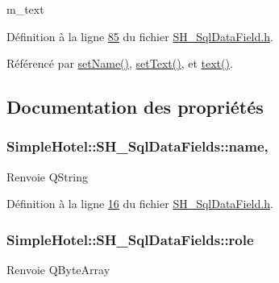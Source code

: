 m\-\_\-text 



Définition à la ligne \hyperlink{SH__SqlDataField_8h_source_l00085}{85} du fichier \hyperlink{SH__SqlDataField_8h_source}{S\-H\-\_\-\-Sql\-Data\-Field.\-h}.



Référencé par \hyperlink{classSimpleHotel_1_1SH__SqlDataFields_a8f12ebe620d294c2f1f8a5f6abdab392}{set\-Name()}, \hyperlink{classSimpleHotel_1_1SH__SqlDataFields_af4b44c8297ef8d8626bd0bc523b190e7}{set\-Text()}, et \hyperlink{classSimpleHotel_1_1SH__SqlDataFields_a6a34a58a64a51a2cc420f5abb8292301}{text()}.



\subsection{Documentation des propriétés}
\hypertarget{classSimpleHotel_1_1SH__SqlDataFields_a2b4f13cf7ea7e33233d63a22c0497bc4}{
\subsubsection[{name}]{\setlength{\rightskip}{0pt plus 5cm}Simple\-Hotel\-::\-S\-H\-\_\-\-Sql\-Data\-Fields\-::name\hspace{0.3cm}{\ttfamily [read]}, {\ttfamily [write]}}}\label{classSimpleHotel_1_1SH__SqlDataFields_a2b4f13cf7ea7e33233d63a22c0497bc4}
\begin{DoxyReturn}{Renvoie}
Q\-String 
\end{DoxyReturn}


Définition à la ligne \hyperlink{SH__SqlDataField_8h_source_l00016}{16} du fichier \hyperlink{SH__SqlDataField_8h_source}{S\-H\-\_\-\-Sql\-Data\-Field.\-h}.

\hypertarget{classSimpleHotel_1_1SH__SqlDataFields_a21b8d3cd626361bf0fa7397af9acc35d}{
\subsubsection[{role}]{\setlength{\rightskip}{0pt plus 5cm}Simple\-Hotel\-::\-S\-H\-\_\-\-Sql\-Data\-Fields\-::role\hspace{0.3cm}{\ttfamily [read]}}}\label{classSimpleHotel_1_1SH__SqlDataFields_a21b8d3cd626361bf0fa7397af9acc35d}
\begin{DoxyReturn}{Renvoie}
Q\-Byte\-Array 
\end{DoxyReturn}



